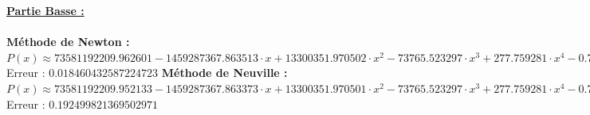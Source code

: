 \documentclass{report}
\begin{document}
      
      \noindent\underline{\textbf{Partie Basse :}} \\ \\
      \textbf{Méthode de Newton :}\\
	$P(x) \approx 73581192209.962601-1459287367.863513 \cdot x + 13300351.970502 \cdot x^{2} - 73765.523297 \cdot x^{3}  + 277.759281 \cdot x^{4} - 0.749863 \cdot x^{5}  + 0.001493 \cdot x^{6} - 0.000002 \cdot x^{7}  + 0.000000 \cdot x^{8} - 0.000000 \cdot x^{9}  + 0.000000 \cdot x^{10} - 0.000000 \cdot x^{11}  + 0.000000 \cdot x^{12} - 0.000000 \cdot x^{13} $\\
	Erreur : $0.018460432587224723$
	\newline
	\newline
	\textbf{Méthode de Neuville :}\\
	$P(x) \approx 73581192209.952133-1459287367.863373 \cdot x + 13300351.970501 \cdot x^{2} - 73765.523297 \cdot x^{3}  + 277.759281 \cdot x^{4} - 0.749863 \cdot x^{5}  + 0.001493 \cdot x^{6} - 0.000002 \cdot x^{7}  + 0.000000 \cdot x^{8} - 0.000000 \cdot x^{9}  + 0.000000 \cdot x^{10} - 0.000000 \cdot x^{11}  + 0.000000 \cdot x^{12} - 0.000000 \cdot x^{13} $\\
	Erreur : $0.192499821369502971$
	\newline
	\newline
	
\end{document}
